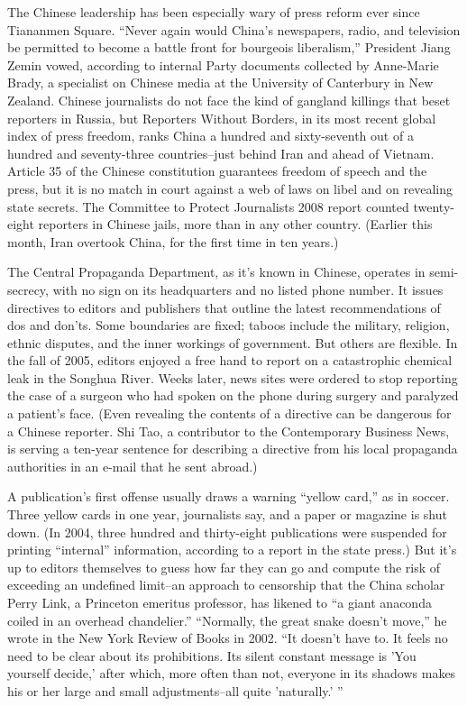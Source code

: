 ﻿\documentclass[12pt]{article}
\begin{document}
The Chinese leadership has been especially wary of press reform ever since Tiananmen Square. ``Never
again would China's newspapers, radio, and television be permitted to become a battle front for
bourgeois liberalism,'' President Jiang Zemin vowed, according to internal Party documents collected
by Anne-Marie Brady, a specialist on Chinese media at the University of Canterbury in New Zealand.
Chinese journalists do not face the kind of gangland killings that beset reporters in Russia, but
Reporters Without Borders, in its most recent global index of press freedom, ranks China a hundred
and sixty-seventh out of a hundred and seventy-three countries--just behind Iran and ahead of
Vietnam. Article 35 of the Chinese constitution guarantees freedom of speech and the press, but it
is no match in court against a web of laws on libel and on revealing state secrets. The Committee to
Protect Journalists 2008 report counted twenty-eight reporters in Chinese jails, more than in any
other country. (Earlier this month, Iran overtook China, for the first time in ten years.)

The Central Propaganda Department, as it's known in Chinese, operates in semi-secrecy, with no sign
on its headquarters and no listed phone number. It issues directives to editors and publishers that
outline the latest recommendations of dos and don'ts. Some boundaries are fixed; taboos include the
military, religion, ethnic disputes, and the inner workings of government. But others are flexible.
In the fall of 2005, editors enjoyed a free hand to report on a catastrophic chemical leak in the
Songhua River. Weeks later, news sites were ordered to stop reporting the case of a surgeon who had
spoken on the phone during surgery and paralyzed a patient's face. (Even revealing the contents of a
directive can be dangerous for a Chinese reporter. Shi Tao, a contributor to the Contemporary
Business News, is serving a ten-year sentence for describing a directive from his local propaganda
authorities in an e-mail that he sent abroad.)

A publication's first offense usually draws a warning ``yellow card,'' as in soccer. Three yellow
cards in one year, journalists say, and a paper or magazine is shut down. (In 2004, three hundred
and thirty-eight publications were suspended for printing ``internal'' information, according to a
report in the state press.) But it's up to editors themselves to guess how far they can go and
compute the risk of exceeding an undefined limit--an approach to censorship that the China scholar
Perry Link, a Princeton emeritus professor, has likened to ``a giant anaconda coiled in an overhead
chandelier.'' ``Normally, the great snake doesn't move,'' he wrote in the New York Review of Books
in 2002. ``It doesn't have to. It feels no need to be clear about its prohibitions. Its silent
constant message is 'You yourself decide,' after which, more often than not, everyone in its shadows
makes his or her large and small adjustments--all quite 'naturally.' ''
\end{document}
